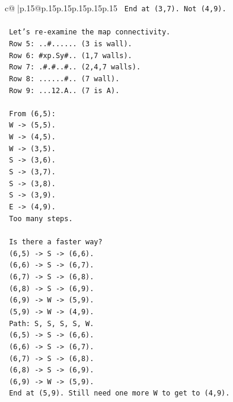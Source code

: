 \documentclass{article}
\begin{document}
{\begin{supertabular}{c@{$\;$}|p{.15\linewidth}@{}p{.15\linewidth}p{.15\linewidth}p{.15\linewidth}p{.15\linewidth}p{.15\linewidth}}
{{{\texttt{      End at (3,7). Not (4,9).} \\
\\ 
\texttt{      Let's re{-}examine the map connectivity.} \\
\texttt{      Row 5: ..\#...... (3 is wall).} \\
\texttt{      Row 6: \#xp.Sy\#.. (1,7 walls).} \\
\texttt{      Row 7: .\#.\#..\#.. (2,4,7 walls).} \\
\texttt{      Row 8: ......\#.. (7 wall).} \\
\texttt{      Row 9: ...12.A.. (7 is A).} \\
\\ 
\texttt{      From (6,5):} \\
\texttt{      W {-}> (5,5).} \\
\texttt{      W {-}> (4,5).} \\
\texttt{      W {-}> (3,5).} \\
\texttt{      S {-}> (3,6).} \\
\texttt{      S {-}> (3,7).} \\
\texttt{      S {-}> (3,8).} \\
\texttt{      S {-}> (3,9).} \\
\texttt{      E {-}> (4,9).} \\
\texttt{      Too many steps.} \\
\\ 
\texttt{      Is there a faster way?} \\
\texttt{      (6,5) {-}> S {-}> (6,6).} \\
\texttt{      (6,6) {-}> S {-}> (6,7).} \\
\texttt{      (6,7) {-}> S {-}> (6,8).} \\
\texttt{      (6,8) {-}> S {-}> (6,9).} \\
\texttt{      (6,9) {-}> W {-}> (5,9).} \\
\texttt{      (5,9) {-}> W {-}> (4,9).} \\
\texttt{      Path: S, S, S, S, W.} \\
\texttt{      (6,5) {-}> S {-}> (6,6).} \\
\texttt{      (6,6) {-}> S {-}> (6,7).} \\
\texttt{      (6,7) {-}> S {-}> (6,8).} \\
\texttt{      (6,8) {-}> S {-}> (6,9).} \\
\texttt{      (6,9) {-}> W {-}> (5,9).} \\
\texttt{      End at (5,9). Still need one more W to get to (4,9).} \\
}}}
\end{supertabular}}
\end{document}
